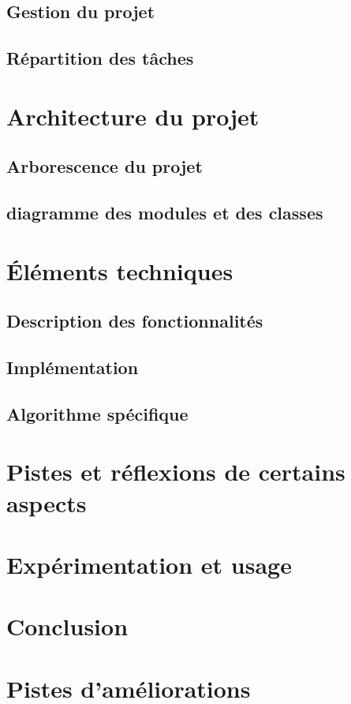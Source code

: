 \documentclass[a4paper, 12pt]{article}
\begin{document}
    \subsection{Gestion du projet}
    \subsection{Répartition des tâches}
\section{Architecture du projet}
    \subsection{Arborescence du projet}
    \subsection{diagramme des modules et des classes}
\section{Éléments techniques}
    \subsection{Description des fonctionnalités}
    \subsection{Implémentation}
    \subsection{Algorithme spécifique}
\section{Pistes et réflexions de certains aspects}
\section{Expérimentation et usage}
\section{Conclusion}
\section{Pistes d'améliorations}

\end{document}
